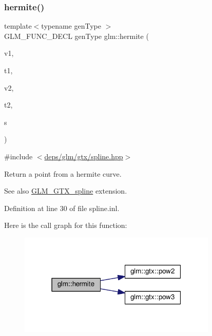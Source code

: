 \mbox{\label{group__gtx__spline_gaa69e143f6374d32f934a8edeaa50bac9}} 
\subsubsection{\texorpdfstring{hermite()}{hermite()}}
{\footnotesize\ttfamily template$<$typename gen\+Type $>$ \\
G\+L\+M\+\_\+\+F\+U\+N\+C\+\_\+\+D\+E\+CL gen\+Type glm\+::hermite (\begin{DoxyParamCaption}\item[{gen\+Type const \&}]{v1,  }\item[{gen\+Type const \&}]{t1,  }\item[{gen\+Type const \&}]{v2,  }\item[{gen\+Type const \&}]{t2,  }\item[{typename gen\+Type\+::value\+\_\+type const \&}]{s }\end{DoxyParamCaption})}



{\ttfamily \#include $<$\hyperlink{spline_8hpp}{deps/glm/gtx/spline.\+hpp}$>$}

Return a point from a hermite curve. \begin{DoxySeeAlso}{See also}
\hyperlink{group__gtx__spline}{G\+L\+M\+\_\+\+G\+T\+X\+\_\+spline} extension. 
\end{DoxySeeAlso}


Definition at line 30 of file spline.\+inl.

Here is the call graph for this function\+:
\nopagebreak
\begin{figure}[H]
\begin{center}
\leavevmode
\includegraphics[width=268pt]{d7/d53/group__gtx__spline_gaa69e143f6374d32f934a8edeaa50bac9_cgraph}
\end{center}
\end{figure}
